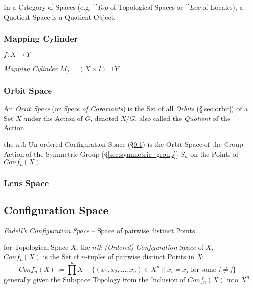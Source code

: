 In a Category of Spaces (e.g. $\cat{Top}$ of Topological Spaces or
$\cat{Loc}$ of Locales), a Quotient Space is a Quotient Object.



\subsubsection{Mapping Cylinder}\label{sec:mapping_cylinder}

$f : X \rightarrow Y$

\emph{Mapping Cylinder} $M_f = (X \times I) \sqcup Y$



\subsubsection{Orbit Space}\label{sec:orbit_space}

An \emph{Orbit Space} (or \emph{Space of Covariants}) is the Set of all
\emph{Orbits} (\S\ref{sec:orbit}) of a Set $X$ under the Action of $G$, denoted
$X / G$, also called the \emph{Quotient} of the Action

the $n$th Un-ordered Configuration Space (\S\ref{sec:configuration_space}) is
the Orbit Space of the Group Action of the Symmetric Group
(\S\ref{sec:symmetric_group}) $S_n$ on the Points of $Conf_n(X)$



\subsubsection{Lens Space}\label{sec:lens_space}



\subsection{Configuration Space}\label{sec:configuration_space}

\emph{Fadell's Configuration Space} -- Space of pairwise distinct Points

for Topological Space $X$, the \emph{$n$th (Ordered) Configuration Space} of
$X$, $Conf_n(X)$ is the Set of $n$-tuples of pairwise distinct Points in $X$:
\[
  Conf_n(X) := \prod^n X - \{(x_1, x_2, \ldots, x_n) \in X^n
    \| x_i = x_j \text{ for some } i \neq j \}
\]
generally given the Subspace Topology from the Inclusion of $Conf_n(X)$ into
$X^n$

